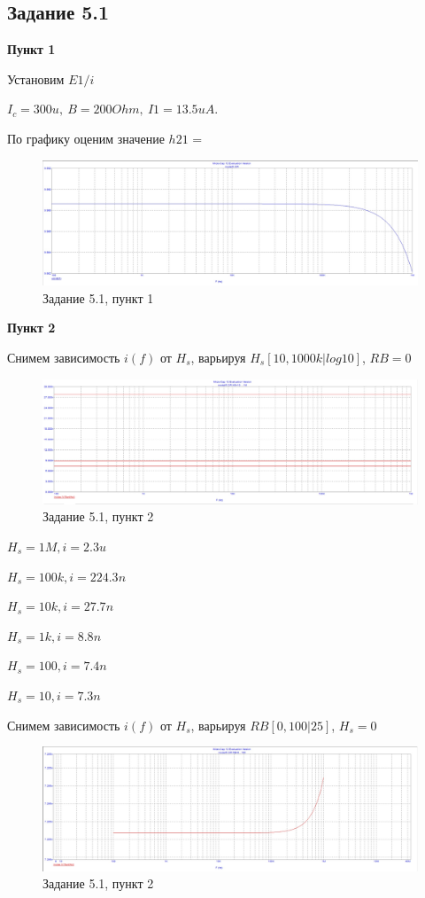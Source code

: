 \documentclass[a4paper, 14pt]{extarticle}%
\begin{document}
\subsection{Задание 5.1}
\textbf{Пункт 1}


Установим ${E1/i}$

$I_c = 300u, \:B = 200Ohm, \: I1 = 13.5uA.$

По графику оценим значение $h21$ =

\begin{figure}[h!]
			\centering
			\includegraphics[width=1.1\linewidth]{5/5_1_1.jpg}
			\caption{Задание 5.1, пункт 1}
			\label{A}
\end{figure}

\textbf{Пункт 2}


Снимем зависимость $i(f)$ от $H_s$, варьируя $H_s[10, 1000k|log10]$, $RB = 0$

\begin{figure}[h!]
			\centering
			\includegraphics[width=1.1\linewidth]{5/5_1_2.jpg}
			\caption{Задание 5.1, пункт 2}
			\label{A}
\end{figure}

$H_s = 1M, i = 2.3u$

$H_s = 100k, i = 224.3n$

$H_s = 10k, i = 27.7n$

$H_s = 1k, i = 8.8n$

$H_s = 100, i = 7.4n$

$H_s = 10, i = 7.3n$

Снимем зависимость $i(f)$ от $H_s$, варьируя $RB[0, 100|25]$, $H_s = 0$

\begin{figure}[h!]
			\centering
			\includegraphics[width=1.1\linewidth]{5/5_1_3.jpg}
			\caption{Задание 5.1, пункт 2}
			\label{A}
\end{figure}
\end{document}
